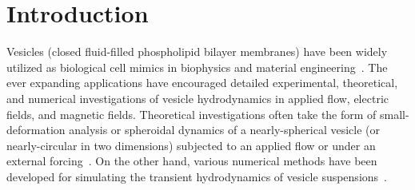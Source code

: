 \documentclass[prf,superscriptaddress,showpacs]{revtex4-1}
\begin{document}
\maketitle



\section{Introduction}
Vesicles (closed fluid-filled phospholipid bilayer membranes) have been
widely utilized as biological cell mimics in biophysics and material
engineering~\cite{sackmann1996, Barthes-Biesel2016_ARFM}.  The ever
expanding applications have encouraged detailed experimental,
theoretical, and numerical investigations of vesicle hydrodynamics in
applied flow, electric fields, and magnetic fields.  Theoretical
investigations often take the form of small-deformation analysis or
spheroidal dynamics of a nearly-spherical vesicle (or nearly-circular in
two dimensions) subjected to an applied flow or under an external
forcing~\cite{Barthes-BieselRallison1981_JFM, Misbah2006_PRL,
Vlahovska2007_PRE, Finken2008_EPL, ZhangZahnTanLin2013_PoF,
Nganguia2013_PRE}.  On the other hand, various numerical methods have
been developed for simulating the transient hydrodynamics of vesicle
suspensions~\cite{BagchiJohoson2005_JBE, Biben2005_EJP,
Veerapaneni2009_JCP, SeolHuKimLai2016_JCP}.  
\end{document}
